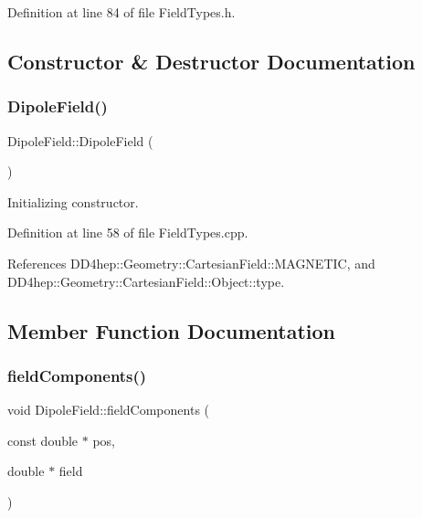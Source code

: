 Definition at line 84 of file Field\+Types.\+h.



\subsection{Constructor \& Destructor Documentation}
\hypertarget{class_d_d4hep_1_1_geometry_1_1_dipole_field_a7a431d40e83bd52565fccf2ed507780e}{}\label{class_d_d4hep_1_1_geometry_1_1_dipole_field_a7a431d40e83bd52565fccf2ed507780e} 
\subsubsection{\texorpdfstring{Dipole\+Field()}{DipoleField()}}
{\footnotesize\ttfamily Dipole\+Field\+::\+Dipole\+Field (\begin{DoxyParamCaption}{ }\end{DoxyParamCaption})}



Initializing constructor. 



Definition at line 58 of file Field\+Types.\+cpp.



References D\+D4hep\+::\+Geometry\+::\+Cartesian\+Field\+::\+M\+A\+G\+N\+E\+T\+IC, and D\+D4hep\+::\+Geometry\+::\+Cartesian\+Field\+::\+Object\+::type.



\subsection{Member Function Documentation}
\hypertarget{class_d_d4hep_1_1_geometry_1_1_dipole_field_afee57d23345cdd6a457475d8fe6ac4a7}{}\label{class_d_d4hep_1_1_geometry_1_1_dipole_field_afee57d23345cdd6a457475d8fe6ac4a7} 
\subsubsection{\texorpdfstring{field\+Components()}{fieldComponents()}}
{\footnotesize\ttfamily void Dipole\+Field\+::field\+Components (\begin{DoxyParamCaption}\item[{const double $\ast$}]{pos,  }\item[{double $\ast$}]{field }\end{DoxyParamCaption})\hspace{0.3cm}{\ttfamily [virtual]}}



